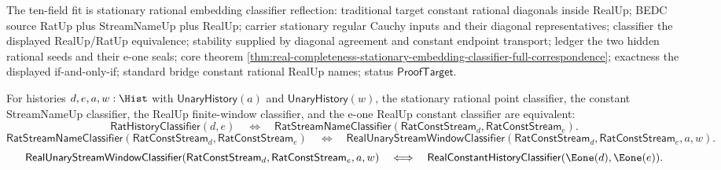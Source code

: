 The ten-field fit is stationary rational embedding classifier reflection:
traditional target constant rational diagonals inside RealUp; BEDC source
RatUp plus StreamNameUp plus RealUp; carrier stationary regular Cauchy inputs
and their diagonal representatives; classifier the displayed RealUp/RatUp
equivalence; stability supplied by diagonal agreement and constant endpoint
transport; ledger the two hidden rational seeds and their e-one seals; core
theorem
\autoref{thm:real-completeness-stationary-embedding-classifier-full-correspondence};
exactness the displayed if-and-only-if; standard bridge constant rational
RealUp names; status $\mathsf{ProofTarget}$.

\begin{theorem}
\label{thm:real-completeness-stationary-rational-finite-window-bridge}
For histories $d,e,a,w:\Hist$ with $\mathsf{UnaryHistory}(a)$ and
$\mathsf{UnaryHistory}(w)$, the stationary rational point classifier, the
constant StreamNameUp classifier, the RealUp finite-window classifier, and the
e-one RealUp constant classifier are equivalent:
$$
\mathsf{RatHistoryClassifier}(d,e)
\quad\Longleftrightarrow\quad
\mathsf{RatStreamNameClassifier}(\mathsf{RatConstStream}_d,\mathsf{RatConstStream}_e).
$$
$$
\mathsf{RatStreamNameClassifier}(\mathsf{RatConstStream}_d,\mathsf{RatConstStream}_e)
\quad\Longleftrightarrow\quad
\mathsf{RealUnaryStreamWindowClassifier}(\mathsf{RatConstStream}_d,\mathsf{RatConstStream}_e,a,w).
$$
$$
\mathsf{RealUnaryStreamWindowClassifier}(\mathsf{RatConstStream}_d,\mathsf{RatConstStream}_e,a,w)
\quad\Longleftrightarrow\quad
\mathsf{RealConstantHistoryClassifier}(\Eone(d),\Eone(e)).
$$
\end{theorem}

